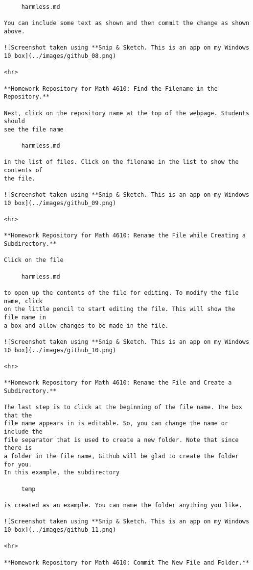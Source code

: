 \begin{verbatim}
     harmless.md

You can include some text as shown and then commit the change as shown above.

![Screenshot taken using **Snip & Sketch. This is an app on my Windows 10 box](../images/github_08.png)

<hr>

**Homework Repository for Math 4610: Find the Filename in the Repository.** 

Next, click on the repository name at the top of the webpage. Students should
see the file name

     harmless.md

in the list of files. Click on the filename in the list to show the contents of
the file. 

![Screenshot taken using **Snip & Sketch. This is an app on my Windows 10 box](../images/github_09.png)

<hr>

**Homework Repository for Math 4610: Rename the File while Creating a Subdirectory.**

Click on the file

     harmless.md

to open up the contents of the file for editing. To modify the file name, click
on the little pencil to start editing the file. This will show the file name in
a box and allow changes to be made in the file.

![Screenshot taken using **Snip & Sketch. This is an app on my Windows 10 box](../images/github_10.png)

<hr>

**Homework Repository for Math 4610: Rename the File and Create a Subdirectory.**

The last step is to click at the beginning of the file name. The box that the
file name appears in is editable. So, you can change the name or include the
file separator that is used to create a new folder. Note that since there is
a folder in the file name, Github will be glad to create the folder for you.
In this example, the subdirectory

     temp

is created as an example. You can name the folder anything you like.

![Screenshot taken using **Snip & Sketch. This is an app on my Windows 10 box](../images/github_11.png)

<hr>

**Homework Repository for Math 4610: Commit The New File and Folder.** 


\end{verbatim}
